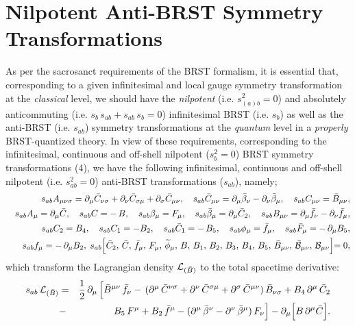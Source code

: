 \documentclass[12pt]{article}
\begin{document}


\section{Nilpotent Anti-BRST Symmetry Transformations}




 


As per the sacrosanct requirements of the BRST formalism, it is essential that, corresponding to a given infinitesimal and local gauge 
symmetry transformation at the {\it classical} level, we should have the {\it nilpotent} (i.e. $s_{(a)b}^2 = 0 $)
and absolutely anticommuting (i.e. $s_b \, s_{ab} + s_{ab}\, s_b = 0$) 
infinitesimal BRST (i.e. $s_b$) as well as the anti-BRST (i.e. $s_{ab}$) symmetry transformations at the {\it quantum} level
in a {\it properly}  BRST-quantized theory. In view of these requirements,
corresponding to the infinitesimal, continuous and off-shell nilpotent ($s_b^2 = 0$) BRST symmetry transformations (4), we have the following 
infinitesimal, continuous and off-shell nilpotent (i.e. $s_{ab}^2 = 0 $)
anti-BRST transformations ($s_{ab}$), namely;
\begin{eqnarray}\label{6}
&&s_{ab} A_{\mu\nu\sigma} = \partial_\mu \bar C_{\nu\sigma} + \partial_\nu \bar C_{\sigma\mu}
+ \partial_\sigma \bar C_{\mu\nu}, \quad  s_{ab} \bar C_{\mu\nu} = \partial_\mu \bar \beta_\nu
- \partial_\nu \bar \beta_\mu, \quad s_{ab}  C_{\mu\nu} = \bar B_{\mu\nu}, \nonumber\\
&&s_{ab} A_{\mu} = \partial_\mu \bar C, \quad s_{ab}  C = -\, B, \quad  
s_{ab}  \beta_\mu =  F_\mu, \quad
s_{ab} \bar \beta_\mu = \partial_\mu \bar C_2, \quad s_{ab} B_{\mu\nu} = \partial_\mu \bar f_\nu - \partial_\nu \bar f_\mu, \nonumber\\
&&s_{ab} {C}_2 = B_4, \quad s_{ab} C_1 = - B_2, \quad  s_{ab} \bar C_1 = -\, B_5, 
\quad s_{ab} \phi_\mu = \bar f_\mu, \quad s_{ab} \bar F_\mu =-\, \partial_\mu B_5,
\nonumber\\
&& s_{ab} f_\mu = -\, \partial_\mu B_2, \; s_{ab}  \Bigl [ \bar C_2,\, \bar C,\, \bar f_\mu,\, {F}_\mu,
\,\widetilde \phi_\mu, \, B,\, B_1, \, B_2,\, B_3, \,  B_4,\, B_5,\, \bar B_{\mu\nu}, \, 
\bar {\cal B}_{\mu\nu}, \, {\cal B}_{\mu\nu}\Bigl ]  = 0,
\end{eqnarray}
which transform the  Lagrangian density ${\cal L}_{(\bar B)}$ to the total spacetime derivative:
\begin{eqnarray}\label{7}
s_{ab}\, {\cal L}_{(\bar B)} &=& \dfrac{1}{2}\, \partial_\mu\, \Big[\bar B^{\mu\nu}\, \bar f_\nu - \, (\partial^\mu\, \bar C^{\nu\sigma} + \partial^\nu\, \bar C^{\sigma\mu}
+ \partial^\sigma\, \bar C^{\mu\nu}) \, \bar B_{\nu\sigma}   + B_4\, \partial^\mu\, \bar C_2  \nonumber\\
&-& B_5\, F^\mu + B_2\, \bar f^\mu - (\partial^\mu\,  \bar \beta^\nu - \partial^\nu\, \bar \beta^\mu)\,  F_\nu \Big] 
- \partial_\mu \Big [B \, \partial^\mu  \bar C \Big ].
\end{eqnarray}
\end{document}
